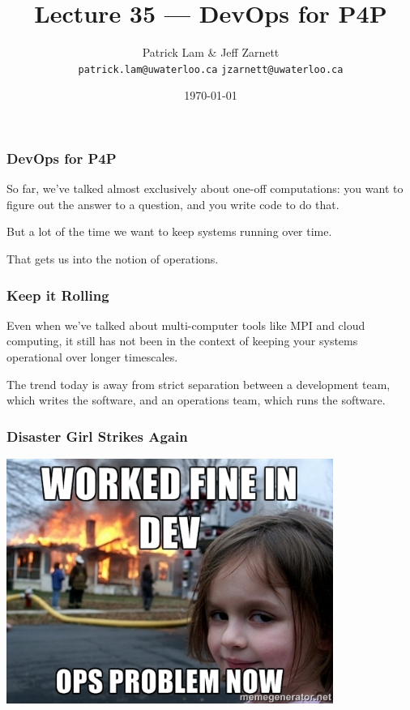 

\title{Lecture 35 --- DevOps for P4P }

\author{Patrick Lam \& Jeff Zarnett \\ \small \texttt{patrick.lam@uwaterloo.ca} \texttt{jzarnett@uwaterloo.ca}}
\date{\today}




\begin{frame}
  \titlepage

 \end{frame}



\begin{frame}
\frametitle{DevOps for P4P}

So far, we've talked almost exclusively about one-off computations:
you want to figure out the answer to a question, and you write code to
do that.

But a lot
of the time we want to keep systems running over time. 

That gets us into the notion of operations. 

\end{frame}



\begin{frame}
\frametitle{Keep it Rolling}

Even when we've talked about multi-computer tools like MPI and cloud
computing, it still has not been in the context of keeping your
systems operational over longer timescales. 

The trend today is away
from strict separation between a development team, which writes the
software, and an operations team, which runs the software.

\end{frame}



\begin{frame}
\frametitle{Disaster Girl Strikes Again}

\begin{center}
	\includegraphics[width=0.8\textwidth]{images/devops.jpg}
\end{center}

\end{frame}



